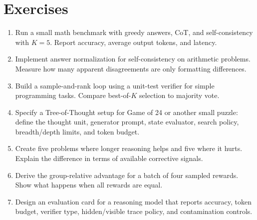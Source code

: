 \section{Exercises}
\begin{enumerate}
    \item Run a small math benchmark with greedy answers, CoT, and self-consistency with $K=5$. Report accuracy, average output tokens, and latency.
    \item Implement answer normalization for self-consistency on arithmetic problems. Measure how many apparent disagreements are only formatting differences.
    \item Build a sample-and-rank loop using a unit-test verifier for simple programming tasks. Compare best-of-$K$ selection to majority vote.
    \item Specify a Tree-of-Thought setup for Game of 24 or another small puzzle: define the thought unit, generator prompt, state evaluator, search policy, breadth/depth limits, and token budget.
    \item Create five problems where longer reasoning helps and five where it hurts. Explain the difference in terms of available corrective signals.
    \item Derive the group-relative advantage for a batch of four sampled rewards. Show what happens when all rewards are equal.
    \item Design an evaluation card for a reasoning model that reports accuracy, token budget, verifier type, hidden/visible trace policy, and contamination controls.
\end{enumerate}
